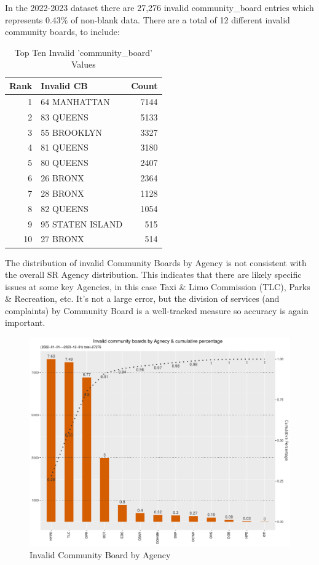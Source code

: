 \documentclass[12pt, titlepage]{article}
\begin{document}
	In the 2022-2023 dataset there are 27,276 invalid community\_board 
	entries which represents 0.43\% of non-blank data. There are a total 
	of 12 different invalid community boards, to include: 
	
		\begin{table}[tbp]
		\centering
		\caption{Top Ten Invalid 'community\_board' Values}
			\begin{tabular}{rlr}
			\toprule
			\textbf{Rank} & \textbf{Invalid CB} & \textbf{Count} \\
				\midrule
					1 & 64 MANHATTAN & 7144 \\
					2 & 83 QUEENS & 5133 \\
					3 & 55 BROOKLYN & 3327 \\
					4 & 81 QUEENS & 3180 \\
					5 & 80 QUEENS & 2407 \\
					6 & 26 BRONX & 2364 \\
					7 & 28 BRONX & 1128 \\
					8 & 82 QUEENS & 1054 \\
					9 & 95 STATEN ISLAND & 515 \\
					10 & 27 BRONX & 514 \\
				\bottomrule
			\end{tabular}
		\end{table}
		
		The distribution of invalid Community Boards by Agency is not consistent 
		with the overall SR Agency distribution. This indicates that there are likely 
		specific issues at some key Agencies, in this case Taxi \& Limo Commission 
		(TLC), Parks \& Recreation, etc. It's not a large error, but the 
		division of services (and complaints) by Community Board is a 
		well-tracked measure so accuracy is again important.

		\begin{figure}[tbp]
		 	 \centering
			  \includegraphics[width = \textwidth]{invalid_community_boards.pdf}
			  \caption{Invalid Community Board by Agency}
			  \label{fig:invalid_community_boards}
		\end{figure}
\end{document}
